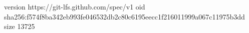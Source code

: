 version https://git-lfs.github.com/spec/v1
oid sha256:f574f8ba342eb993fe046532db2c80c6195eecc1f216011999a067c11975b3dd
size 13725
